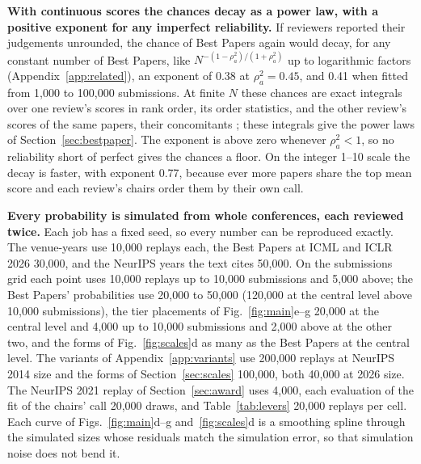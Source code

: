 \documentclass{article}
\begin{document}
\textbf{With continuous scores the chances decay as a power law, with a positive exponent for any imperfect reliability.} If reviewers reported their judgements unrounded, the chance of Best Papers again would decay, for any constant number of Best Papers, like $N^{-(1-\rho_a^2)/(1+\rho_a^2)}$ up to logarithmic factors (Appendix~\ref{app:related}), an exponent of 0.38 at $\rho_a^2=0.45$, and 0.41 when fitted from 1,000 to 100,000 submissions. At finite $N$ these chances are exact integrals over one review's scores in rank order, its order statistics, and the other review's scores of the same papers, their concomitants \citep{yeo1984selection,nagaraja1994concomitants,david2003order}; these integrals give the power laws of Section~\ref{sec:bestpaper}. The exponent is above zero whenever $\rho_a^2<1$, so no reliability short of perfect gives the chances a floor. On the integer 1--10 scale the decay is faster, with exponent 0.77, because ever more papers share the top mean score and each review's chairs order them by their own call.

\textbf{Every probability is simulated from whole conferences, each reviewed twice.} Each job has a fixed seed, so every number can be reproduced exactly. The venue-years use 10,000 replays each, the Best Papers at ICML and ICLR 2026 30,000, and the NeurIPS years the text cites 50,000. On the submissions grid each point uses 10,000 replays up to 10,000 submissions and 5,000 above; the Best Papers' probabilities use 20,000 to 50,000 (120,000 at the central level above 10,000 submissions), the tier placements of Fig.~\ref{fig:main}e--g 20,000 at the central level and 4,000 up to 10,000 submissions and 2,000 above at the other two, and the forms of Fig.~\ref{fig:scales}d as many as the Best Papers at the central level. The variants of Appendix~\ref{app:variants} use 200,000 replays at NeurIPS 2014 size and the forms of Section~\ref{sec:scales} 100,000, both 40,000 at 2026 size. The NeurIPS 2021 replay of Section~\ref{sec:award} uses 4,000, each evaluation of the fit of the chairs' call 20,000 draws, and Table~\ref{tab:levers} 20,000 replays per cell. Each curve of Figs.~\ref{fig:main}d--g and~\ref{fig:scales}d is a smoothing spline through the simulated sizes whose residuals match the simulation error, so that simulation noise does not bend it.
\end{document}
